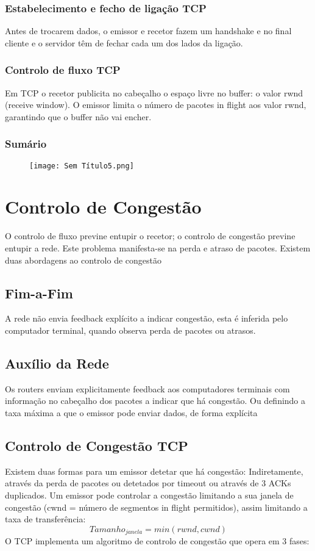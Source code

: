 \documentclass[10pt,a4paper]{report}
\begin{document}
\subsubsection{Estabelecimento e fecho de ligação TCP}
Antes de trocarem dados, o emissor e recetor fazem um handshake e no final cliente e o servidor têm de fechar cada um dos lados da ligação.
\subsubsection{Controlo de fluxo TCP}
Em TCP o recetor publicita no cabeçalho o espaço livre no buffer: o valor rwnd (receive window). O emissor limita o número de pacotes in flight aos valor rwnd, garantindo que o buffer não vai encher.
\subsubsection{Sumário}
\begin{figure}[h]
\centering
\texttt{[image: Sem Título5.png]}
\end{figure}
\section{Controlo de Congestão}
O controlo de fluxo previne entupir o recetor; o controlo de congestão previne entupir a rede. Este problema manifesta-se na perda e atraso de pacotes. Existem duas abordagens ao controlo de congestão
\subsection{Fim-a-Fim}
A rede não envia feedback explícito a indicar congestão, esta é inferida pelo computador terminal, quando observa perda de pacotes ou atrasos.
\subsection{Auxílio da Rede}
Os routers enviam explicitamente feedback aos computadores terminais com informação no cabeçalho dos pacotes a indicar que há congestão. Ou definindo a taxa máxima a que o emissor pode enviar dados, de forma explícita
\subsection{Controlo de Congestão TCP}
Existem duas formas para um emissor detetar que há congestão: Indiretamente, através da perda de pacotes ou detetados por timeout ou através de 3 ACKs
duplicados. Um emissor pode controlar a congestão limitando a sua janela de congestão (cwnd = número de segmentos in flight permitidos), assim limitando a taxa de transferência:
$$
Tamanho_{janela} = min(rwnd,cwnd)
$$
O TCP implementa um algoritmo de controlo de congestão que opera em 3 fases:
\end{document}
